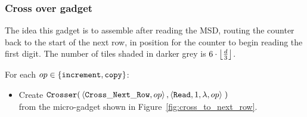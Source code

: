 \subsubsection{Cross over gadget}

The idea this gadget is to assemble after reading the MSD, routing the counter back to the start of the
next row, in position for the counter to begin reading the first digit.
The number of tiles shaded in darker grey is $6 \cdot \floor*{\frac{d}{3}}$.

\vspace{.5cm}
For each $\inc\in \{ {\tt increment}, {\tt copy} \}$:

\begin{itemize}
    \item Create
    $\begin{aligned}[t]
        {\tt Crosser}(&\left\langle {\tt Cross\_Next\_Row}, \inc \right\rangle,
                       \left\langle {\tt Read}, 1, \lambda, \inc \right\rangle \;)
    \end{aligned}$\\from the micro-gadget shown in Figure~\ref{fig:cross_to_next_row}.
\end{itemize}


